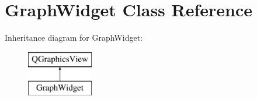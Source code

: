 \hypertarget{class_graph_widget}{}\section{Graph\+Widget Class Reference}
\label{class_graph_widget}
Inheritance diagram for Graph\+Widget\+:\begin{figure}[H]
\begin{center}
\leavevmode
\includegraphics[height=2.000000cm]{class_graph_widget}
\end{center}
\end{figure}

